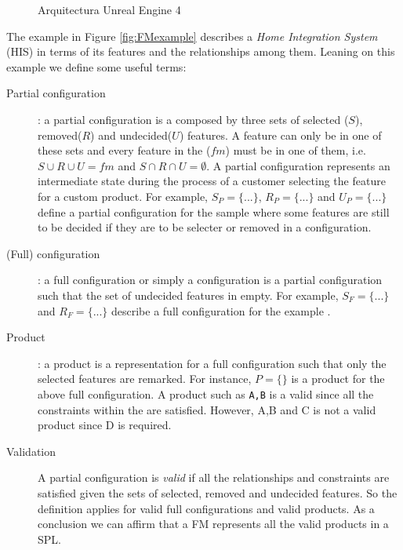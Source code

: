 \begin{figure}[htb]
	\centering
		\caption{Arquitectura Unreal Engine 4}
\end{figure}

The example in Figure \ref{fig:FMexample} describes a \emph{Home Integration System} (HIS) \spl in terms of its features and the relationships among them. Leaning on this example we define some useful terms:

\begin{description}
\item[Partial configuration] : a partial configuration is a composed by three sets of selected ($S$), removed($R$) and undecided($U$) features.  A feature can only be in one of these sets and every feature in the \fm ($fm$) must be in one of them, i.e. $S \cup R \cup U = fm$ and $S \cap R \cap U = \emptyset$. A partial configuration represents an intermediate state during the process of a customer selecting the feature for a custom product. For example, $S_P=\{...\}$, $R_P=\{...\}$ and $U_P=\{...\}$ define a partial configuration for the sample \fm where some features are still to be decided if they are to be selecter or removed in a configuration.
\end{description}

\begin{description}
\item[(Full) configuration] : a full configuration or simply a configuration is a partial configuration such that the set of undecided features in empty. For example, $S_F=\{...\}$ and $R_F=\{...\}$ describe a full configuration for the example \fm.
\end{description}

\begin{description}
\item[Product] : a product is a representation for a full configuration such that only the selected features are remarked. For instance, $P=\{\}$ is a product for the above full configuration. A product such as \texttt{A,B} is a valid since all the constraints within the \fm are satisfied. However, A,B and C is not a valid product since D is required.
\end{description}

\begin{description}
\item[Validation]
A partial configuration is \emph{valid} if all the relationships and constraints are satisfied given the sets of selected, removed and undecided features. So the definition applies for valid full configurations and valid products. As a conclusion we can affirm that a FM represents all the valid products in a SPL.
\end{description}


